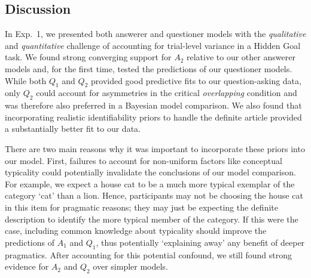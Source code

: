 \documentclass[11pt, floatsintext]{apa6}
\begin{document}


\subsection{Discussion}

In Exp.~1, we presented both answerer and questioner models with the  \emph{qualitative} and \emph{quantitative} challenge of accounting for trial-level variance in a Hidden Goal task. 
We found strong converging support for $A_2$ relative to our other answerer models and, for the first time, tested the predictions of our questioner models. 
While both $Q_1$ and $Q_2$ provided good predictive fits to our question-asking data, only $Q_2$ could account for asymmetries in the critical \emph{overlapping} condition and was therefore also preferred in a Bayesian model comparison. 
We also found that incorporating realistic identifiability priors to handle the definite article provided a substantially better fit to our data. 

There are two main reasons why it was important to incorporate these priors into our model.
First, failures to account for non-uniform factors like conceptual typicality could potentially invalidate the conclusions of our model comparison. 
For example, we expect a house cat to be a much more typical exemplar of the category `cat' than a lion. 
Hence, participants may not be choosing the house cat in this item for pragmatic reasons; they may just be expecting the definite description to identify the more typical member of the category. 
If this were the case, including common knowledge about typicality should improve the predictions of $A_1$ and $Q_1$, thus potentially `explaining away' any benefit of deeper pragmatics. 
After accounting for this potential confound, we still found strong evidence for $A_2$ and $Q_2$ over simpler models.
\end{document}
